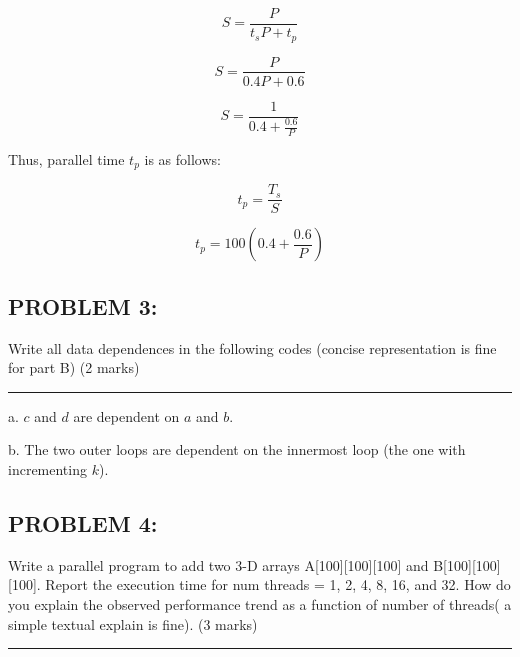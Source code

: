 \documentclass[12pt,letterpaper]{article}
\begin{document}
\[ S = \frac{P}{t_sP + t_p} \]

\[ S = \frac{P}{0.4P + 0.6} \]

\[ S = \frac{1}{ 0.4 + \frac{0.6}{P}} \]

Thus, parallel time \(t_p\) is as follows:

\[ t_p = \frac{T_s}{S} \]

\[ t_p = 100(0.4 + \frac{0.6}{P}) \]

\pagebreak


\subsection*{PROBLEM 3:}
Write all data dependences in the following codes (concise representation is fine for 
part B) (2 marks)

\noindent\rule{\textwidth}{1pt}

a. \(c\) and \(d\) are dependent on \(a\) and \(b\).

b. The two outer loops are dependent on the innermost loop (the one with incrementing \(k\)).


\subsection*{PROBLEM 4:}
Write a parallel program to add two 3-D arrays A[100][100][100] and B[100][100][100]. 
Report the execution time for num threads = 1, 2, 4, 8, 16, and 32. How do you explain 
the observed performance trend as a function of number of threads( a simple textual 
explain is fine). (3 marks)

\noindent\rule{\textwidth}{1pt}
\end{document}
